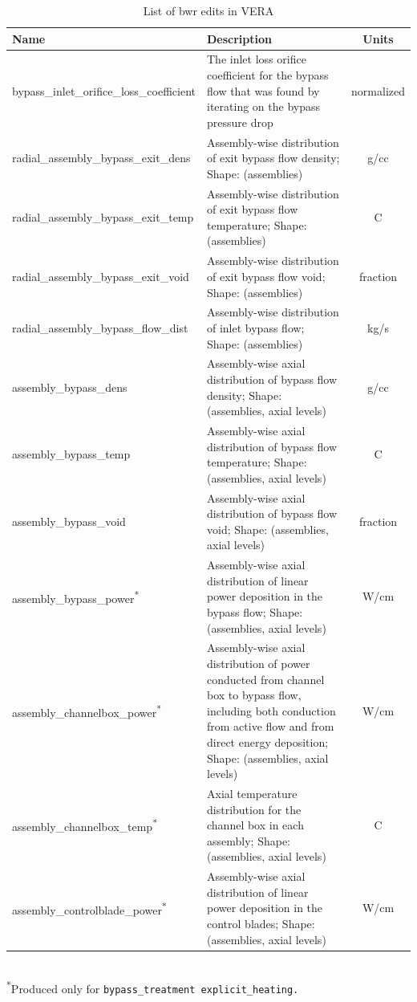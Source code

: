 \begin{table}[h]
    \centering
    \caption{List of \acrshort{bwr} edits in VERA}
    \label{tab:bwr-edits}
    \begin{tabular}{|l|p{}|c|}\hline
    \textbf{Name} & \textbf{Description} & \textbf{Units} \\\hline
bypass\_inlet\_orifice\_loss\_coefficient & The inlet loss orifice coefficient for the bypass flow that was found by iterating on the bypass pressure drop & normalized \\\hline
radial\_assembly\_bypass\_exit\_dens & Assembly-wise distribution of exit bypass flow density; Shape: (assemblies) & g/cc \\\hline
radial\_assembly\_bypass\_exit\_temp & Assembly-wise distribution of exit bypass flow temperature; Shape: (assemblies) & C \\\hline
radial\_assembly\_bypass\_exit\_void & Assembly-wise distribution of exit bypass flow void; Shape: (assemblies) & fraction \\\hline
radial\_assembly\_bypass\_flow\_dist & Assembly-wise distribution of inlet bypass flow; Shape: (assemblies) & kg/s \\\hline
assembly\_bypass\_dens & Assembly-wise axial distribution of bypass flow density; Shape: (assemblies, axial levels) & g/cc \\\hline
assembly\_bypass\_temp & Assembly-wise axial distribution of bypass flow temperature; Shape: (assemblies, axial levels) & C \\\hline
assembly\_bypass\_void & Assembly-wise axial distribution of bypass flow void; Shape: (assemblies, axial levels) & fraction \\\hline
assembly\_bypass\_power\textsuperscript{*} & Assembly-wise axial distribution of linear power deposition in the bypass flow; Shape: (assemblies, axial levels) & W/cm \\\hline
assembly\_channelbox\_power\textsuperscript{*} & Assembly-wise axial distribution of power conducted from channel box to bypass flow, including both conduction from active flow and from direct energy deposition; Shape: (assemblies, axial levels) & W/cm \\\hline
assembly\_channelbox\_temp\textsuperscript{*} & Axial temperature distribution for the channel box in each assembly; Shape: (assemblies, axial levels) & C \\\hline
assembly\_controlblade\_power\textsuperscript{*} & Assembly-wise axial distribution of linear power deposition in the control blades; Shape: (assemblies, axial levels) & W/cm \\\hline
    \end{tabular}
    \\
    \small\textsuperscript{*}Produced only for \texttt{bypass\_treatment explicit\_heating.}
\end{table}

